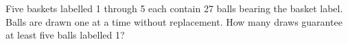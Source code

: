 Five baskets labelled 1 through 5 each contain 27 balls bearing the basket label. Balls are drawn one at a time without replacement. How many draws guarantee at least five balls labelled 1?
